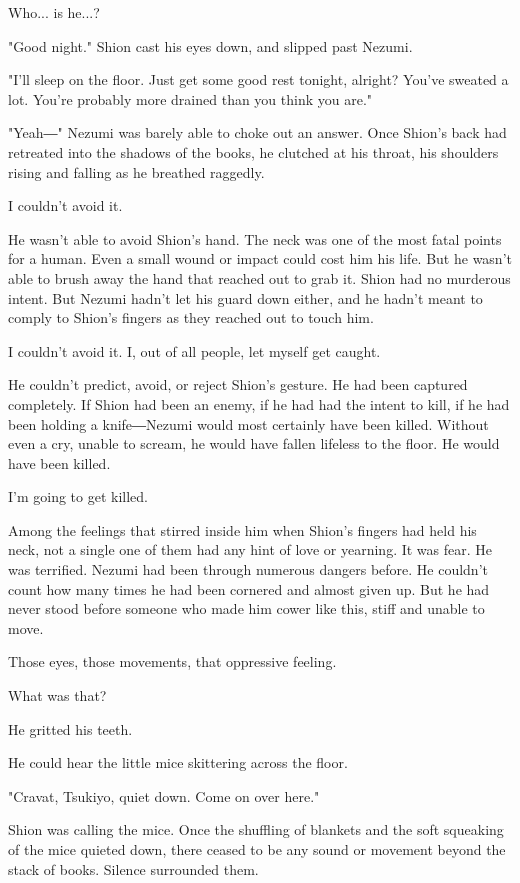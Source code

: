 Who... is he...?

"Good night." Shion cast his eyes down, and slipped past Nezumi.

"I'll sleep on the floor. Just get some good rest tonight, alright?
You've sweated a lot. You're probably more drained than you think you
are."

"Yeah―" Nezumi was barely able to choke out an answer. Once Shion's back
had retreated into the shadows of the books, he clutched at his throat,
his shoulders rising and falling as he breathed raggedly.

I couldn't avoid it.

He wasn't able to avoid Shion's hand. The neck was one of the most fatal
points for a human. Even a small wound or impact could cost him his
life. But he wasn't able to brush away the hand that reached out to grab
it. Shion had no murderous intent. But Nezumi hadn't let his guard down
either, and he hadn't meant to comply to Shion's fingers as they reached
out to touch him.

I couldn't avoid it. I, out of all people, let myself get caught.

He couldn't predict, avoid, or reject Shion's gesture. He had been
captured completely. If Shion had been an enemy, if he had had the
intent to kill, if he had been holding a knife―Nezumi would most
certainly have been killed. Without even a cry, unable to scream, he
would have fallen lifeless to the floor. He would have been killed.

I'm going to get killed.

Among the feelings that stirred inside him when Shion's fingers had held
his neck, not a single one of them had any hint of love or yearning. It
was fear. He was terrified. Nezumi had been through numerous dangers
before. He couldn't count how many times he had been cornered and almost
given up. But he had never stood before someone who made him cower like
this, stiff and unable to move.

Those eyes, those movements, that oppressive feeling.

What was that?

He gritted his teeth.

He could hear the little mice skittering across the floor.

"Cravat, Tsukiyo, quiet down. Come on over here."

Shion was calling the mice. Once the shuffling of blankets and the soft
squeaking of the mice quieted down, there ceased to be any sound or
movement beyond the stack of books. Silence surrounded them.


